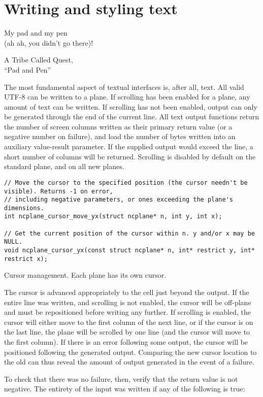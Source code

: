 \section{Writing and styling text}
\label{sec:output}
\epigraph{My pad and my pen\\(ah ah, you didn't go there)!}{A Tribe Called Quest,\\``Pad and Pen''}
The most fundamental aspect of textual interfaces is, after all, text. All
valid UTF-8 can be written to a plane. If scrolling has been enabled for a
plane, any amount of text can be written. If scrolling has not been enabled,
output can only be generated through the end of the current line. All text
output functions return the number of screen columns written as their primary
return value (or a negative number on failure), and load the number of bytes
written into an auxiliary value-result parameter. If the supplied output would
exceed the line, a short number of columns will be returned. Scrolling is
disabled by default on the standard plane, and on all new planes.

\begin{listing}[!htb]
\begin{verbatim}
// Move the cursor to the specified position (the cursor needn't be visible). Returns -1 on error,
// including negative parameters, or ones exceeding the plane's dimensions.
int ncplane_cursor_move_yx(struct ncplane* n, int y, int x);

// Get the current position of the cursor within n. y and/or x may be NULL.
void ncplane_cursor_yx(const struct ncplane* n, int* restrict y, int* restrict x);
\end{verbatim}
\caption{Cursor management. Each plane has its own cursor.}
\label{list:cursor}
\end{listing}

The cursor is advanced appropriately to the cell just beyond the output. If the
entire line was written, and scrolling is not enabled, the cursor will be
off-plane and must be repositioned before writing any further. If scrolling is
enabled, the cursor will either move to the first column of the next line, or
if the cursor is on the last line, the plane will be scrolled by one line (and
the cursor will move to the first column). If there is an error following some
output, the cursor will be positioned following the generated output. Comparing
the new cursor location to the old can thus reveal the amount of output generated
in the event of a failure.

To check that there was no failure, then, verify that the return value is not
negative. The entirety of the input was written if any of the following is
true:

